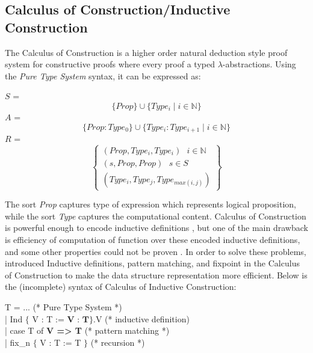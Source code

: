 \subsection{Calculus of Construction/Inductive Construction}
\label{sec:cc}
The Calculus of Construction is a higher order  natural deduction style proof system 
for constructive proofs where every proof a typed $\lambda$-abstractions.  Using the 
\textit{Pure Type System} syntax, it can be expressed as:

\begin{displayquote}

    $S$ = \[ \lbrace  Prop \rbrace \cup \lbrace  Type_{i} \mid  i \in \mathbb{N} \rbrace \]
    $A$ =  \[ \lbrace Prop : Type_{0} \rbrace \cup \lbrace Type_{i} : Type_{i+1} \mid i \in \mathbb{N} \rbrace \]
    $R$ = 
     \[
   \left\{ \begin{array}{l}
   (Prop, Type_{i}, Type_{i}) \text{      } i \in \mathbb{N}  \\
   (s, Prop, Prop)  \text{     } s \in S \\
   (Type_{i}, Type_{j}, Type_{max (i, j)}) 
  \end{array}\right\}
\]
       
\end{displayquote}

\noindent
The sort \textit{Prop} captures type of expression which represents logical proposition, while 
the sort \textit{Type} captures the computational content.   Calculus of Construction is
 powerful enough to encode inductive definitions \citep{pfenning1989inductively}, but 
 one of the main drawback is efficiency of computation of function over these encoded 
 inductive definitions, and some other properties could not be proven \citep{10.1007/3-540-45413-6_16}.
In order to solve these problems, \citep{Paulin-Mohring:1993:IDS:645891.671440}  introduced 
Inductive definitions, pattern matching, and fixpoint in the Calculus of Construction to make the data structure 
representation more efficient. Below is the  (incomplete) syntax of Calculus of Inductive Construction:

 \begin{displayquote}

    T = ...  (*  Pure Type System *) \\
       | Ind $\lbrace$ V : T :=  $\textbf{V : T} \rbrace$.V (* inductive definition) \\
       | case T of \textbf{V => T} (* pattern matching *)  \\
       | fix_{n}  $\lbrace$ V : T := T $\rbrace$ (* recursion *) \\
   \end{displayquote}
 
